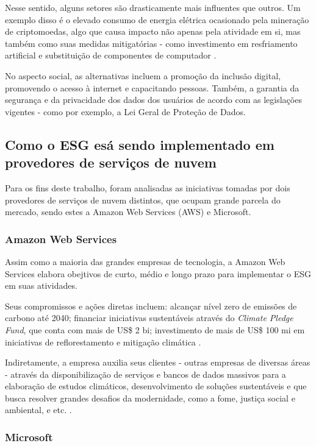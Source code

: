 \documentclass[12pt]{article}
\begin{document}
	Nesse sentido, alguns setores são drasticamente mais influentes que outros. Um exemplo disso é o elevado consumo de energia elétrica ocasionado pela mineração de criptomoedas, algo que causa impacto não apenas pela atividade em si, mas também como suas medidas mitigatórias - como investimento em resfriamento artificial e substituição de componentes de computador \cite{kohliAnalysisEnergyConsumption2023}.
	
	No aspecto social, as alternativas incluem a promoção da inclusão digital, promovendo o acesso à internet e capacitando pessoas. Também, a garantia da segurança e da privacidade dos dados dos usuários de acordo com as legislações vigentes - como  por exemplo, a Lei Geral de Proteção de Dados.
	
	\subsection*{Como o ESG esá sendo implementado em provedores de serviços de nuvem}
	
	Para os fins deste trabalho, foram analisadas as iniciativas tomadas por dois provedores de serviços de nuvem distintos, que ocupam grande parcela do mercado, sendo estes a Amazon Web Services (AWS) e Microsoft.
	
	\subsubsection*{Amazon Web Services}
	
	Assim como a maioria das grandes empresas de tecnologia, a Amazon Web Services elabora obejtivos de curto, médio e longo prazo para implementar o ESG em suas atividades.
	
	Seus compromissos e ações diretas incluem: alcançar nível zero de emissões de carbono até 2040; financiar iniciativas sustentáveis através do \emph{Climate Pledge Fund}, que conta com mais de US\$ 2 bi; investimento de mais de US\$ 100 mi em iniciativas de reflorestamento e mitigação climática \cite{amazonwebservicesClimateConnections2022}.
	
	Indiretamente, a empresa auxilia seus clientes - outras empresas de diversas áreas - através da disponibilização de serviços e bancos de dados massivos para a elaboração de estudos climáticos, desenvolvimento de soluções sustentáveis e que busca resolver grandes desafios da modernidade, como a fome, justiça social e ambiental, e etc. \cite{amazonwebservicesClimateConnections2022}.
	
	\subsubsection*{Microsoft}
	
\end{document}
